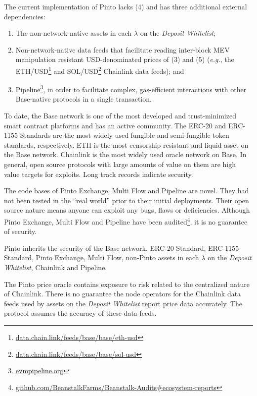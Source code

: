 \documentclass[tikz]{article}
\newcommand{\term}[1]{\textsl{#1}}
\newcommand{\fref}[1]{\footnote{\href{http://#1}{#1}}}
\begin{document}
The current implementation of Pinto lacks (4) and has three additional external dependencies: 

\begin{enumerate}[label=(\arabic*), start=5]
    \item The non-network-native assets in each $\lambda$ on the \term{Deposit Whitelist};
    \item Non-network-native data feeds that facilitate reading inter-block MEV manipulation resistant USD-denominated prices of (3) and (5) (\textit{e.g.}, the ETH/USD\fref{data.chain.link/feeds/base/base/eth-usd} and SOL/USD\fref{data.chain.link/feeds/base/base/sol-usd} Chainlink data feeds); and 
    \item Pipeline\fref{evmpipeline.org}, in order to facilitate complex, gas-efficient interactions with other Base-native protocols in a single transaction.
\end{enumerate}

To date, the Base network is one of the most developed and trust-minimized smart contract platforms and has an active community. The ERC-20 and ERC-1155 Standards are the most widely used fungible and semi-fungible token standards, respectively. ETH is the most censorship resistant and liquid asset on the Base network. Chainlink is the most widely used oracle network on Base. In general, open source protocols with large amounts of value on them are high value targets for exploits. Long track records indicate security. 

The code bases of Pinto Exchange, Multi Flow and Pipeline are novel. They had not been tested in the “real world” prior to their initial deployments. Their open source nature means anyone can exploit any bugs, flaws or deficiencies. Although Pinto Exchange, Multi Flow and Pipeline have been audited\fref{github.com/BeanstalkFarms/Beanstalk-Audits\#ecosystem-reports}, it is no guarantee of security.

Pinto inherits the security of the Base network, ERC-20 Standard, ERC-1155 Standard, Pinto Exchange, Multi Flow, non-Pinto assets in each $\lambda$ on the \term{Deposit Whitelist}, Chainlink and Pipeline. 

The Pinto price oracle contains exposure to risk related to the centralized nature of Chainlink. There is no guarantee the node operators for the Chainlink data feeds used by assets on the \term{Deposit Whitelist} report price data accurately. The protocol assumes the accuracy of these data feeds.

\end{document}

